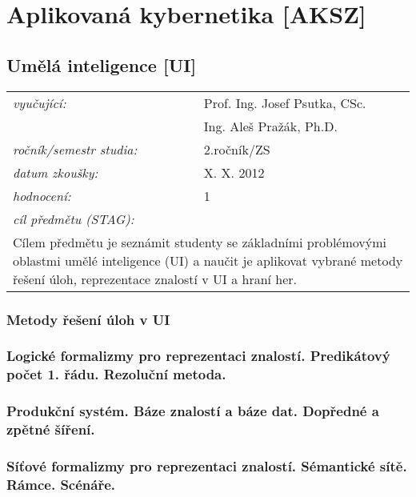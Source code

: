 \chapter{Aplikovaná kybernetika [AKSZ]}

\section{Umělá inteligence [UI]}

\begin{table}[H]
\centering
\begin{tabular}{p{4cm} p{12cm}}
\textit{vyučující:}             & Prof. Ing. Josef Psutka, CSc. \\
								 & Ing. Aleš Pražák, Ph.D. \\
\textit{ročník/semestr studia:} & 2.ročník/ZS \\
\textit{datum zkoušky:}         & X. X. 2012 \\
\textit{hodnocení:}             & 1 \\
\textit{cíl předmětu (STAG):}   & \\
\multicolumn{2}{p{16cm}}{Cílem předmětu je seznámit studenty se základními problémovými oblastmi umělé inteligence (UI) a naučit je aplikovat vybrané metody řešení úloh, reprezentace znalostí v UI a hraní her.}
\end{tabular}
\end{table}

\subsection{Metody řešení úloh v UI}

\subsection{Logické formalizmy pro reprezentaci znalostí. Predikátový počet 1. řádu. Rezoluční metoda.}

\subsection{Produkční systém. Báze znalostí a báze dat. Dopředné a zpětné šíření.}

\subsection{Síťové formalizmy pro reprezentaci znalostí. Sémantické sítě. Rámce. Scénáře.}


